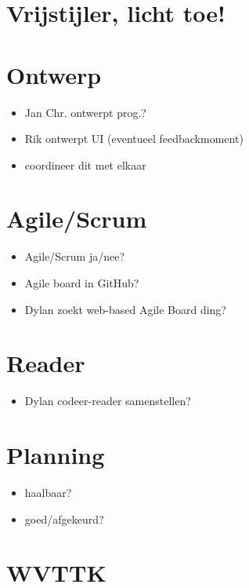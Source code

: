 \documentclass[a4paper, 10pt]{article}
\begin{document}
\section{Vrijstijler, licht toe!}

\section{Ontwerp}
\begin{itemize}
	\item Jan Chr. ontwerpt prog.?
	\item Rik ontwerpt UI (eventueel feedbackmoment)
	\item coordineer dit met elkaar
\end{itemize}

\section{Agile/Scrum}
\begin{itemize}
	\item Agile/Scrum ja/nee?
	\item Agile board in GitHub?
	\item Dylan zoekt web-based Agile Board ding?
\end{itemize}

\section{Reader}
\begin{itemize}
	\item Dylan codeer-reader samenstellen?
\end{itemize}

\section{Planning}
\begin{itemize}
	\item haalbaar?
	\item goed/afgekeurd?
\end{itemize}

\newpage
\section{WVTTK}
\end{document}
